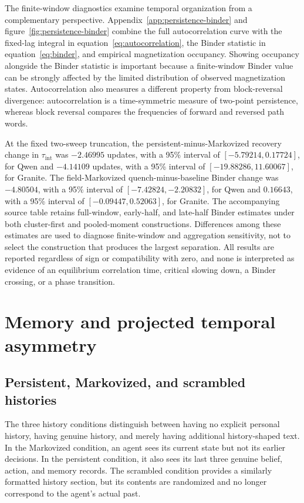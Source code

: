 \documentclass[12pt]{article}
\begin{document}
The finite-window diagnostics examine temporal organization from a
complementary perspective. Appendix~\ref{app:persistence-binder} and
figure~\ref{fig:persistence-binder} combine the full autocorrelation curve with
the fixed-lag integral in equation~\eqref{eq:autocorrelation}, the Binder
statistic in equation~\eqref{eq:binder}, and empirical magnetization
occupancy. Showing occupancy alongside the Binder statistic is important
because a finite-window Binder value can be strongly affected by the limited
distribution of observed magnetization states. Autocorrelation also measures
a different property from block-reversal divergence: autocorrelation is a
time-symmetric measure of two-point persistence, whereas block reversal
compares the frequencies of forward and reversed path words.

At the fixed two-sweep truncation, the persistent-minus-Markovized recovery
change in $\tau_{\mathrm{int}}$ was $-2.46995$ updates, with a 95\% interval of
$[-5.79214,0.17724]$, for Qwen and $-4.14109$ updates, with a 95\% interval of
$[-19.88286,11.60067]$, for Granite. The field-Markovized
quench-minus-baseline Binder change was $-4.80504$, with a 95\% interval of
$[-7.42824,-2.20832]$, for Qwen and $0.16643$, with a 95\% interval of
$[-0.09447,0.52063]$, for Granite. The accompanying source table retains
full-window, early-half, and late-half Binder estimates under both
cluster-first and pooled-moment constructions. Differences among these
estimates are used to diagnose finite-window and aggregation sensitivity, not
to select the construction that produces the largest separation. All results
are reported regardless of sign or compatibility with zero, and none is
interpreted as evidence of an equilibrium correlation time, critical slowing
down, a Binder crossing, or a phase transition.







\section{Memory and projected temporal asymmetry}
\label{sec:memory-results}


\subsection{Persistent, Markovized, and scrambled histories}
\label{sec:persistent-markovized}

The three history conditions distinguish between having no explicit personal
history, having genuine history, and merely having additional history-shaped
text. In the Markovized condition, an agent sees its current state but not its
earlier decisions. In the persistent condition, it also sees its last three
genuine belief, action, and memory records. The scrambled condition provides a
similarly formatted history section, but its contents are randomized and no
longer correspond to the agent's actual past.
\end{document}
